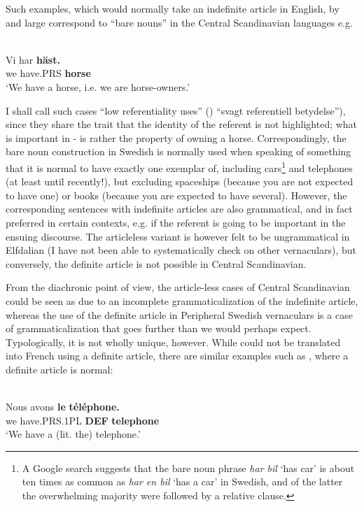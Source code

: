 \z

Such examples, which would normally take an indefinite article in English, by and large correspond to “bare nouns” in the Central Scandinavian languages e.g.

\ea \label{} 
\\
\gll Vi  har  \textbf{häst.}\\
we  have.PRS  \textbf{horse}\\
\glt ‘We have a horse, i.e. we are horse-owners.’

\z

I shall call such cases “low referentiality uses” (\citet[3:56]{TelemanEtAl1999}) “svagt referentiell betydelse”), since they share the trait that the identity of the referent is not highlighted; what is important in - is rather the property of owning a horse. Correspondingly, the bare noun construction in Swedish is normally used when speaking of something that it is normal to have exactly one exemplar of, including cars\footnote{ A Google search suggests that the bare noun phrase \textit{har bil} ‘has car’ is about ten times as common as \textit{har en bil} ‘has a car’ in Swedish, and of the latter the overwhelming majority were followed by a relative clause. } and telephones (at least until recently!), but excluding spaceships (because you are not expected to have one) or books (because you are expected to have several). However, the corresponding sentences with indefinite articles are also grammatical, and in fact preferred in certain contexts, e.g. if the referent is going to be important in the ensuing discourse. The articleless variant is however felt to be ungrammatical in Elfdalian (I have not been able to systematically check on other vernaculars), but conversely, the definite article is not possible in Central Scandinavian. 

From the diachronic point of view, the article-less cases of Central Scandinavian could be seen as due to an incomplete grammaticalization of the indefinite article, whereas the use of the definite article in Peripheral Swedish vernaculars is a case of grammaticalization that goes further than we would perhaps expect. Typologically, it is not wholly unique, however. While  could not be translated into French using a definite article, there are similar examples such as , where a definite article is normal:

\ea \label{} 
\\
\gll Nous  avons  \textbf{le} \textbf{téléphone.}\\
we  have.PRS.1PL  \textbf{DEF} \textbf{telephone}\\
\glt ‘We have a (lit. the) telephone.’

